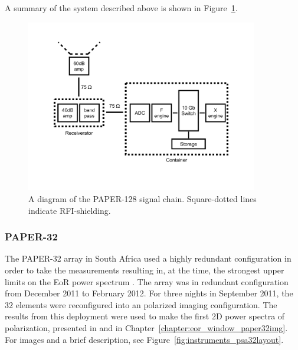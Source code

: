 A summary of the system described above is shown in Figure~\ref{fig:instruments_PAPER_Signal_Chain}.

\begin{figure}
\includegraphics[width=0.9\textwidth]{chapters/instruments/figures/PAPER_system_diagram.pdf}
\caption{A diagram of the PAPER-128 signal chain. Square-dotted lines indicate RFI-shielding.}
\label{fig:instruments_PAPER_Signal_Chain}
\end{figure}

\subsubsection{PAPER-32}

The PAPER-32 array in South Africa used a highly redundant configuration in order to take the measurements resulting in, at the time, the strongest upper limits on the EoR power spectrum \citep[][sections of \citealt{Moore.17} are presented in Chapter~\ref{chapter:ionosphere}]{Parsons.14, Jacobs.15, Moore.17}. The array was in redundant configuration from December 2011 to February 2012. For three nights in September 2011, the 32 elements were reconfigured into an polarized imaging configuration. The results from this deployment were used to make the first 2D power spectra of polarization, presented in \cite{Kohn.16} and in Chapter~\ref{chapter:eor_window_paper32img}. For images and a brief description, see Figure~\ref{fig:instruments_psa32layout}.

